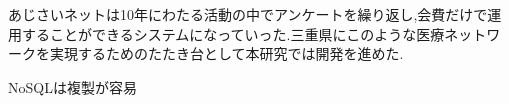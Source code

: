  あじさいネットは10年にわたる活動の中でアンケートを繰り返し,会費だけで運用することができるシステムになっていった.三重県にこのような医療ネットワークを実現するためのたたき台として本研究では開発を進めた.

 NoSQLは複製が容易

